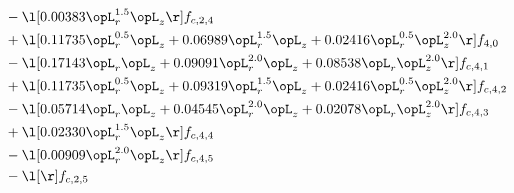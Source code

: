 \begin{alignat}{2}
& - \l[  0.00383 \opL_r^{1.5} \opL_z  \r] f_{c,2,4} \nonumber \\ 
& + \l[  0.11735 \opL_r^{0.5} \opL_z +  0.06989 \opL_r^{1.5} \opL_z +  0.02416 \opL_r^{0.5} \opL_z^{2.0}  \r] f_{4,0} \nonumber \\ 
& - \l[  0.17143 \opL_r \opL_z +  0.09091 \opL_r^{2.0} \opL_z +  0.08538 \opL_r \opL_z^{2.0}  \r] f_{c,4,1} \nonumber \\ 
& + \l[  0.11735 \opL_r^{0.5} \opL_z +  0.09319 \opL_r^{1.5} \opL_z +  0.02416 \opL_r^{0.5} \opL_z^{2.0}  \r] f_{c,4,2} \nonumber \\ 
& - \l[  0.05714 \opL_r \opL_z +  0.04545 \opL_r^{2.0} \opL_z +  0.02078 \opL_r \opL_z^{2.0}  \r] f_{c,4,3} \nonumber \\ 
& + \l[  0.02330 \opL_r^{1.5} \opL_z  \r] f_{c,4,4} \nonumber \\ 
& - \l[  0.00909 \opL_r^{2.0} \opL_z  \r] f_{c,4,5} \nonumber \\ 
& - \l[  \r] f_{c,2,5} \nonumber \\ 
\end{alignat} 


